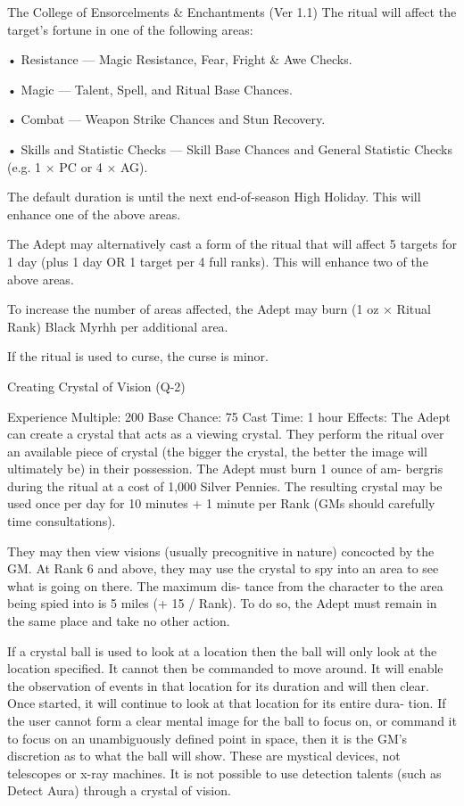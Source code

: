 \begin{Chapter}{The College of Ensorcelments \& Enchantments (Ver 1.1)}
The ritual will affect the target’s fortune in one of 
the following areas:  

•  Resistance  —  Magic  Resistance,  Fear,  Fright  \& 
Awe Checks.  

• Magic — Talent, Spell, and Ritual Base Chances.  

•  Combat  —  Weapon  Strike  Chances  and  Stun 
Recovery.  

• Skills and Statistic Checks — Skill Base Chances 
and  General  Statistic  Checks  (e.g.  1  ×  PC  or  4  × 
AG). 

The default duration is until the next end-of-season 
High  Holiday.  This  will  enhance  one  of  the  above 
areas. 

The  Adept  may  alternatively  cast  a  form  of  the 
ritual that will affect 5 targets for 1 day (plus 1 day 
OR  1  target  per  4  full  ranks).  This  will  enhance 
two of the above areas. 

To  increase  the  number  of  areas  affected,  the 
Adept may burn (1 oz × Ritual Rank) Black Myrhh 
per additional area. 

If the ritual is used to curse, the curse is minor. 

Creating Crystal of Vision (Q-2) 

Experience Multiple: 200 
Base Chance: 75%
Cast Time: 1 hour 
Effects: The Adept can create a crystal that acts as 
a  viewing  crystal.  They  perform the  ritual  over  an 
available  piece  of  crystal  (the  bigger  the  crystal, 
the  better  the  image  will  ultimately  be)  in  their 
possession.  The  Adept  must  burn  1  ounce  of  am-
bergris  during  the  ritual  at  a  cost  of  1,000  Silver 
Pennies.  The  resulting  crystal  may  be  used  once 
per day for 10 minutes + 1 minute per Rank (GMs 
should carefully time consultations). 

They  may  then  view  visions  (usually  precognitive 
in  nature)  concocted  by  the  GM.  At  Rank  6  and 
above, they may use the crystal to spy into an area 
to  see  what  is  going  on  there.  The  maximum  dis-
tance  from  the  character  to  the  area  being  spied 
into is 5 miles (+ 15 / Rank). To do so, the Adept 
must  remain  in  the  same  place  and  take  no  other 
action. 

If a crystal ball is used to look at a location then the 
ball  will  only  look  at  the  location  specified.  It 
cannot then be commanded to move around. It will 
enable the observation of events in that location for 
its duration and will then clear. Once started, it will 
continue to look at that location for its entire dura-
tion.  If  the  user  cannot  form a  clear  mental  image 
for the ball to focus on, or command it to focus on 
an unambiguously defined point in space, then it is 
the GM’s discretion as to what the ball  will show. 
These are mystical devices, not telescopes or x-ray 
machines. It is not possible to use detection talents 
(such as Detect Aura) through a crystal of vision. 


\end{Chapter}
